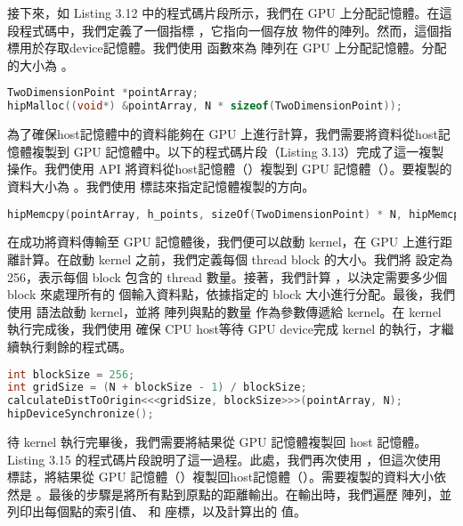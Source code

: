 接下來，如 Listing 3.12 中的程式碼片段所示，我們在 GPU 上分配記憶體。在這段程式碼中，我們定義了一個指標 ，它指向一個存放  物件的陣列。然而，這個指標用於存取device記憶體。我們使用  函數來為  陣列在 GPU 上分配記憶體。分配的大小為 。

\begin{lstlisting}[language=C, caption={GPU記憶體的配置}, label={12th:example}]
TwoDimensionPoint *pointArray;
hipMalloc((void*) &pointArray, N * sizeof(TwoDimensionPoint));
\end{lstlisting}

為了確保host記憶體中的資料能夠在 GPU 上進行計算，我們需要將資料從host記憶體複製到 GPU 記憶體中。以下的程式碼片段（Listing 3.13）完成了這一複製操作。我們使用  API 將資料從host記憶體（）複製到 GPU 記憶體（）。要複製的資料大小為 。我們使用  標誌來指定記憶體複製的方向。

\begin{lstlisting}[language=C, caption={從CPU到GPU的記憶體複製}, label={13th:example}]
hipMemcpy(pointArray, h_points, sizeOf(TwoDimensionPoint) * N, hipMemcpyHostToDevice);
\end{lstlisting}

在成功將資料傳輸至 GPU 記憶體後，我們便可以啟動  kernel，在 GPU 上進行距離計算。在啟動 kernel 之前，我們定義每個 thread block 的大小。我們將  設定為 256，表示每個 block 包含的 thread 數量。接著，我們計算 ，以決定需要多少個 block 來處理所有的  個輸入資料點，依據指定的 block 大小進行分配。最後，我們使用  語法啟動 kernel，並將  陣列與點的數量  作為參數傳遞給 kernel。在 kernel 執行完成後，我們使用  確保 CPU host等待 GPU device完成 kernel 的執行，才繼續執行剩餘的程式碼。

\begin{lstlisting}[language=C, caption={啟動kernel}, label={14th:example}]
int blockSize = 256;
int gridSize = (N + blockSize - 1) / blockSize;
calculateDistToOrigin<<<gridSize, blockSize>>>(pointArray, N);
hipDeviceSynchronize();
\end{lstlisting}

待 kernel 執行完畢後，我們需要將結果從 GPU 記憶體複製回 host 記憶體。Listing 3.15 的程式碼片段說明了這一過程。此處，我們再次使用 ，但這次使用  標誌，將結果從 GPU 記憶體（）複製回host記憶體（）。需要複製的資料大小依然是 。最後的步驟是將所有點到原點的距離輸出。在輸出時，我們遍歷  陣列，並列印出每個點的索引值、 和  座標，以及計算出的  值。

